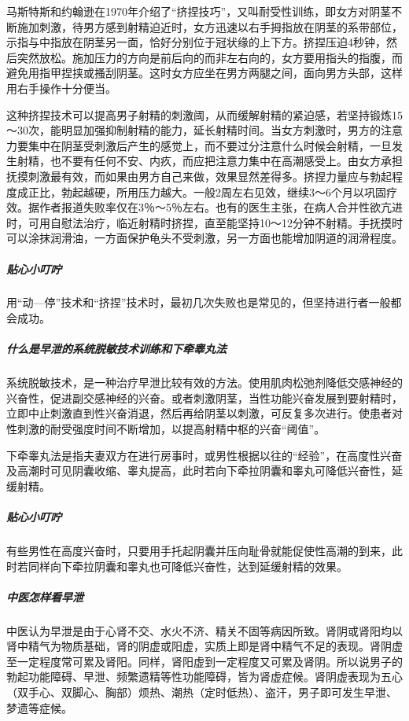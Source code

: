 马斯特斯和约翰逊在1970年介绍了“挤捏技巧”，又叫耐受性训练，即女方对阴茎不断施加刺激，待男方感到射精迫近时，女方迅速以右手拇指放在阴茎的系带部位，示指与中指放在阴茎另一面，恰好分别位于冠状缘的上下方。挤捏压迫4秒钟，然后突然放松。施加压力的方向是前后向的而非左右向的，女方要用指头的指腹，而避免用指甲捏挟或搔刮阴茎。这时女方应坐在男方两腿之间，面向男方头部，这样用右手操作十分便当。

这种挤捏技术可以提高男子射精的刺激阈，从而缓解射精的紧迫感，若坚持锻炼15～30次，能明显加强抑制射精的能力，延长射精时间。当女方刺激时，男方的注意力要集中在阴茎受刺激后产生的感觉上，而不要过分注意什么时候会射精，一旦发生射精，也不要有任何不安、内疚，而应把注意力集中在高潮感受上。由女方承担抚摸刺激最有效，而如果由男方自己来做，效果显然差得多。挤捏力量应与勃起程度成正比，勃起越硬，所用压力越大。一般2周左右见效，继续3～6个月以巩固疗效。据作者报道失败率仅在3％～5％左右。也有的医生主张，在病人合并性欲亢进时，可用自慰法治疗，临近射精时挤捏，直至能坚持10～12分钟不射精。手抚摸时可以涂抹润滑油，一方面保护龟头不受刺激，另一方面也能增加阴道的润滑程度。

\subparagraph{贴心小叮咛}

用“动—停”技术和“挤捏”技术时，最初几次失败也是常见的，但坚持进行者一般都会成功。

\subparagraph{什么是早泄的系统脱敏技术训练和下牵睾丸法}

系统脱敏技术，是一种治疗早泄比较有效的方法。使用肌肉松弛剂降低交感神经的兴奋性，促进副交感神经的兴奋。或者刺激阴茎，当性功能兴奋发展到要射精时，立即中止刺激直到性兴奋消退，然后再给阴茎以刺激，可反复多次进行。使患者对性刺激的耐受强度时间不断增加，以提高射精中枢的兴奋“阈值”。

下牵睾丸法是指夫妻双方在进行房事时，或男性根据以往的“经验”，在高度性兴奋及高潮时可见阴囊收缩、睾丸提高，此时若向下牵拉阴囊和睾丸可降低兴奋性，延缓射精。

\subparagraph{贴心小叮咛}

有些男性在高度兴奋时，只要用手托起阴囊并压向耻骨就能促使性高潮的到来，此时若同样向下牵拉阴囊和睾丸也可降低兴奋性，达到延缓射精的效果。

\subparagraph{中医怎样看早泄}

中医认为早泄是由于心肾不交、水火不济、精关不固等病因所致。肾阴或肾阳均以肾中精气为物质基础，肾的阴虚或阳虚，实质上即是肾中精气不足的表现。肾阴虚至一定程度常可累及肾阳。同样，肾阳虚到一定程度又可累及肾阴。所以说男子的勃起功能障碍、早泄、频繁遗精等性功能障碍，皆为肾虚症候。肾阴虚表现为五心（双手心、双脚心、胸部）烦热、潮热（定时低热）、盗汗，男子即可发生早泄、梦遗等症候。

